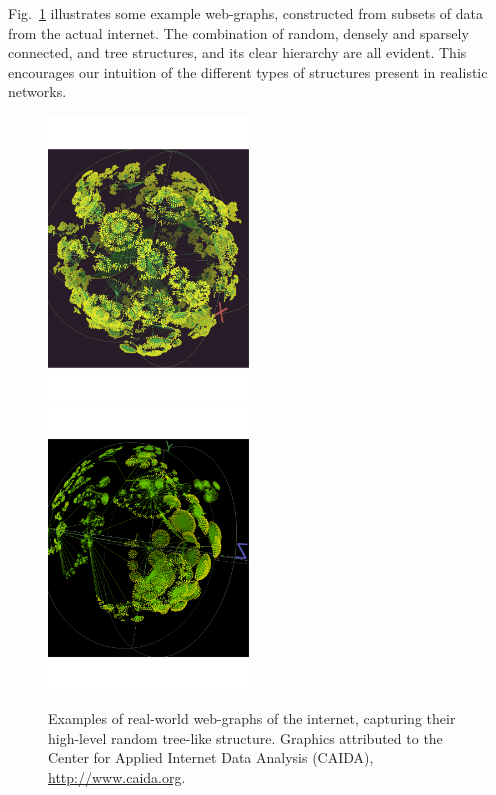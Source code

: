 Fig.~\ref{fig:webgraph} illustrates some example web-graphs, constructed from subsets of data from the actual internet. The combination of random, densely and sparsely connected, and tree structures, and its clear hierarchy are all evident. This encourages our intuition of the different types of structures present in realistic networks.

\pubmode
	\begin{figure}[!htbp]
	\includegraphics[width=0.475\textwidth]{webgraph_1}\\
	\includegraphics[width=0.475\textwidth]{webgraph_2}
	\caption{Examples of real-world web-graphs of the internet, capturing their high-level random tree-like structure. Graphics attributed to the Center for Applied Internet Data Analysis (CAIDA), \href{http://www.caida.org}{http://www.caida.org}.} \label{fig:webgraph}
	\end{figure}
